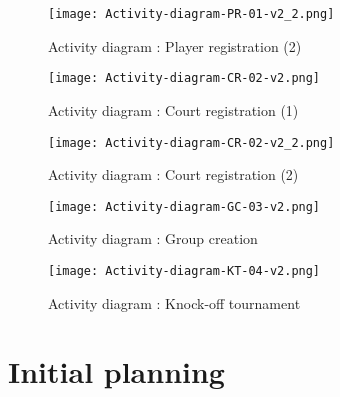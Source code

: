 \begin{figure}
    \texttt{[image: Activity-diagram-PR-01-v2\_2.png]}
    \caption{Activity diagram : Player registration (2)}
\end{figure}
\FloatBarrier

\begin{figure}[!ht]
    \centering
    \texttt{[image: Activity-diagram-CR-02-v2.png]}
    \caption{Activity diagram : Court registration (1)}
    \texttt{[image: Activity-diagram-CR-02-v2\_2.png]}
    \caption{Activity diagram : Court registration (2)}
\end{figure}

\begin{figure}[!ht]
	\centering
     \texttt{[image: Activity-diagram-GC-03-v2.png]}
     \caption{Activity diagram : Group creation}
\end{figure}

\begin{figure}[!ht]
	\centering
    \texttt{[image: Activity-diagram-KT-04-v2.png]}
    \caption{Activity diagram : Knock-off tournament}
\end{figure}

\FloatBarrier

\section{Initial planning}


